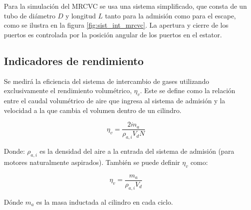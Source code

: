 
Para la simulación del MRCVC se usa una sistema simplificado, que consta de un
tubo de diámetro $D$ y longitud $L$ tanto para la admisión como para el escape,
como se ilustra en la figura \ref{fig:sist_int_mrcvc}.
%
La apertura y cierre de los puertos es controlada por la posición angular de los
puertos en el estator.


\subsection{Indicadores de rendimiento}

Se medirá la eficiencia del sistema de intercambio de gases utilizando
exclusivamente el rendimiento volumétrico, $\eta_v$.
%
Este se define como la relación entre el caudal volumétrico de aire que ingresa
al sistema de admisión y la velocidad a la que cambia el volumen dentro de un
cilindro.


\begin{equation}
  \label{eq:rendVol}
  \eta_v = \frac{2 \dot{m}_a}{\rho_{a,i} V_d N}
\end{equation}

Donde: $\rho_{a,i}$ es la densidad del aire a la entrada del sistema de
admisión (para motores naturalmente aspirados). También se puede definir
$\eta_v$ como:

\begin{equation}
    \label{eq:rendVol2}
    \eta_v = \frac{m_a}{\rho_{a,i} V_d}
\end{equation}

Dónde $m_a$ es la masa inductada al cilindro en cada ciclo.

